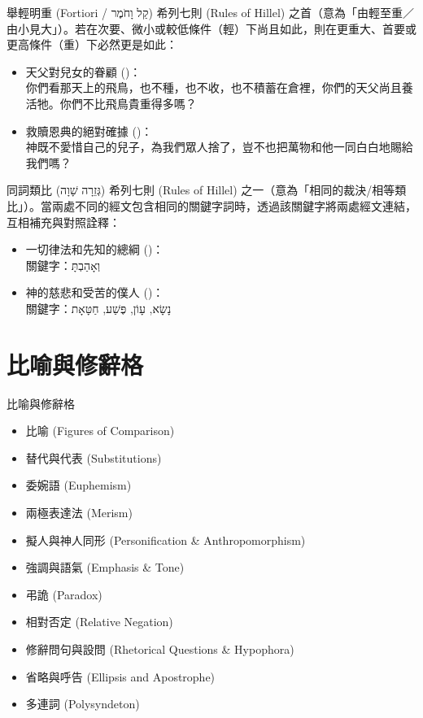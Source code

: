 \documentclass{beamer}
\begin{document}
\begin{frame}{舉輕明重 (Fortiori / \texthebrew{קַל וָחֹמֶר})}
  希列七則 (Rules of Hillel)\parencite{RulesOfHillel} 之首（意為「由輕至重／由小見大」）。若在次要、微小或較低條件（輕）下尚且如此，則在更重大、首要或更高條件（重）下必然更是如此：
  \begin{itemize}
    \item 天父對兒女的眷顧 ()：\\
      你們看那天上的飛鳥，也不種，也不收，也不積蓄在倉裡，你們的天父尚且養活牠。你們不比飛鳥貴重得多嗎？
    \item 救贖恩典的絕對確據 ()：\\
      神既不愛惜自己的兒子，為我們眾人捨了，豈不也把萬物和他一同白白地賜給我們嗎？
  \end{itemize}
\end{frame}

\begin{frame}{同詞類比 (\texthebrew{גְּזֵרָה שָׁוָה})}
  希列七則 (Rules of Hillel)\parencite{RulesOfHillel} 之一（意為「相同的裁決/相等類比」）。當兩處不同的經文包含相同的關鍵字詞時，透過該關鍵字將兩處經文連結，互相補充與對照詮釋：
  \begin{itemize}
    \item 一切律法和先知的總綱 ()：\\
      關鍵字：\texthebrew{וְאָהַבְתָּ}
    \item 神的慈悲和受苦的僕人 ()\parencite{Forgiveness}：\\
      關鍵字：\texthebrew{נָשָׂא}, \texthebrew{עָוֹן}, \texthebrew{פֶּשַׁע}, \texthebrew{חַטָּאָת}
  \end{itemize}
\end{frame}

\section{比喻與修辭格}

\begin{frame}{比喻與修辭格}
  \begin{itemize}
    \item 比喻 (Figures of Comparison)
    \item 替代與代表 (Substitutions)
    \item 委婉語 (Euphemism)
    \item 兩極表達法 (Merism)
    \item 擬人與神人同形 (Personification \& Anthropomorphism)
    \item 強調與語氣 (Emphasis \& Tone)
    \item 弔詭 (Paradox)
    \item 相對否定 (Relative Negation)
    \item 修辭問句與設問 (Rhetorical Questions \& Hypophora)
    \item 省略與呼告 (Ellipsis and Apostrophe)
    \item 多連詞 (Polysyndeton)
  \end{itemize}
\end{frame}
\end{document}
